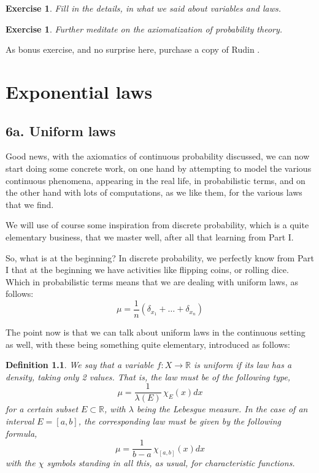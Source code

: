 \documentclass[12pt]{amsbook}
\newtheorem{definition}[theorem]{Definition}
\newtheorem{exercise}[theorem]{Exercise}
\begin{document}
\begin{exercise}
Fill in the details, in what we said about variables and laws.
\end{exercise}

\begin{exercise}
Further meditate on the axiomatization of probability theory.
\end{exercise}

As bonus exercise, and no surprise here, purchase a copy of Rudin \cite{rud}.

\chapter{Exponential laws}

\section*{6a. Uniform laws}

Good news, with the axiomatics of continuous probability discussed, we can now start doing some concrete work, on one hand by attempting to model the various continuous phenomena, appearing in the real life, in probabilistic terms, and on the other hand with lots of computations, as we like them, for the various laws that we find.

\bigskip

We will use of course some inspiration from discrete probability, which is a quite elementary business, that we master well, after all that learning from Part I. 

\bigskip

So, what is at the beginning? In discrete probability, we perfectly know from Part I that at the beginning we have activities like flipping coins, or rolling dice. Which in probabilistic terms means that we are dealing with uniform laws, as follows:
$$\mu=\frac{1}{n}\left(\delta_{x_1}+\ldots+\delta_{x_n}\right)$$

The point now is that we can talk about uniform laws in the continuous setting as well, with these being something quite elementary, introduced as follows:

\begin{definition}
We say that a variable $f:X\to\mathbb R$ is uniform if its law has a density, taking only 2 values. That is, the law must be of the following type,
$$\mu=\frac{1}{\lambda(E)}\,\chi_E(x)dx$$
for a certain subset $E\subset\mathbb R$, with $\lambda$ being the Lebesgue measure. In the case of an interval $E=[a,b]$, the corresponding law must be given by the following formula,
$$\mu=\frac{1}{b-a}\,\chi_{[a,b]}(x)dx$$
with the $\chi$ symbols standing in all this, as usual, for characteristic functions.
\end{definition}
\end{document}
